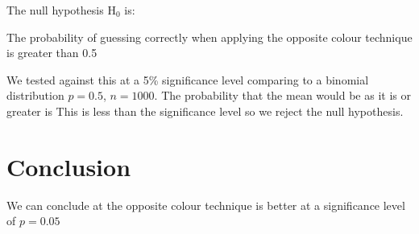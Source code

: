 \documentclass{article}
\begin{document}
    The null hypothesis \(\mathrm{H}_0\) is: 
    
    The probability of guessing correctly when applying the opposite colour technique is greater than 0.5
    
    We tested against this at a 5\% significance level comparing to a binomial distribution \(p=0.5\), \(n=1000\).
    The probability that the mean would be as it is or greater is %
    This is less than the significance level so we reject the null hypothesis.
    
    
    \section*{Conclusion}
    We can conclude at the opposite colour technique is better at a significance level of \(p=0.05\)
\end{document}

